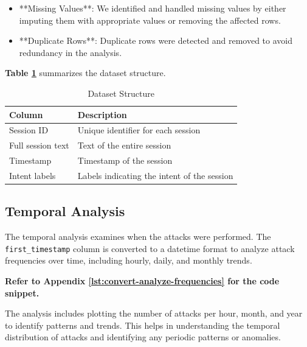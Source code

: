         \begin{itemize}
            \item **Missing Values**: We identified and handled missing values by either imputing them with appropriate values or removing the affected rows.
            \item **Duplicate Rows**: Duplicate rows were detected and removed to avoid redundancy in the analysis.
        \end{itemize}

        \textbf{Table \ref{tab:dataset-structure}} summarizes the dataset structure.

        \begin{table}[h]
            \centering
            \begin{tabular}{|l|l|}
                \hline
                \textbf{Column} & \textbf{Description} \\ \hline
                Session ID & Unique identifier for each session \\ \hline
                Full session text & Text of the entire session \\ \hline
                Timestamp & Timestamp of the session \\ \hline
                Intent labels & Labels indicating the intent of the session \\ \hline
            \end{tabular}
            \vspace{1em}
            \caption{Dataset Structure}
            \label{tab:dataset-structure}
        \end{table}

    \subsection{Temporal Analysis}
    
        The temporal analysis examines when the attacks were performed. The \texttt{first\_timestamp} column is converted to a datetime format to analyze attack frequencies over time, including hourly, daily, and monthly trends.
            
        \textbf{Refer to Appendix \ref{lst:convert-analyze-frequencies} for the code snippet.}

        The analysis includes plotting the number of attacks per hour, month, and year to identify patterns and trends. This helps in understanding the temporal distribution of attacks and identifying any periodic patterns or anomalies.

